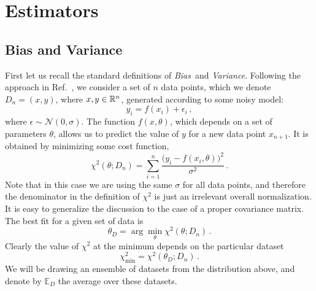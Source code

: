 \section{Estimators}
\label{sec:estimators}

\subsection{Bias and Variance}
\label{sec:BandV}

First let us recall the standard definitions of {\em Bias}\ and {\em Variance}.
Following the approach in Ref.~\cite{Mehta:2018dln}, we consider a set of $n$
data points, which we denote $D_n=\left(x,y\right)$, where $x,y \in \mathbb{R}^n$,
generated according to some noisy model:
\begin{equation}
    \label{eq:NoisyData}
    y_i = f(x_i) + \epsilon_i\, ,    
\end{equation}
where $\epsilon\sim\mathcal{N}(0,\sigma)$. The function $f(x,\theta)$, which
depends on a set of parameters $\theta$, allows us to predict the value of $y$
for a new data point $x_{n+1}$. It is obtained by minimizing some cost function,
\eg
\begin{equation}
    \label{eq:CostFuncChi}
    \chi^2(\theta; D_n) = \sum_{i=1}^n 
    \frac{\Big(
        y_i - f(x_i,\theta)
    \Big)^2}{\sigma^2}\, . 
\end{equation}
Note that in this case we are using the same $\sigma$ for all data points, and
therefore the denominator in the definition of $\chi^2$ is just an irrelevant
overall normalization. It is easy to generalize the discussion to the case of a
proper covariance matrix. The best fit for a given set of data is 
\begin{equation}
    \label{eq:ThetaMin}
    \theta_D = \arg\min_\theta \chi^2(\theta; D_n)\, .
\end{equation} 
Clearly the value of $\chi^2$ at the minimum depends on the particular dataset
\begin{equation}
    \label{eq:ChiAtMin}
    \chi^2_\mathrm{min}=\chi^2(\theta_D; D_n)\, . 
\end{equation}
We will be drawing an ensemble of datasets from the distribution above, and denote by $\mathbb{E}_D$ the average over these datasets.

